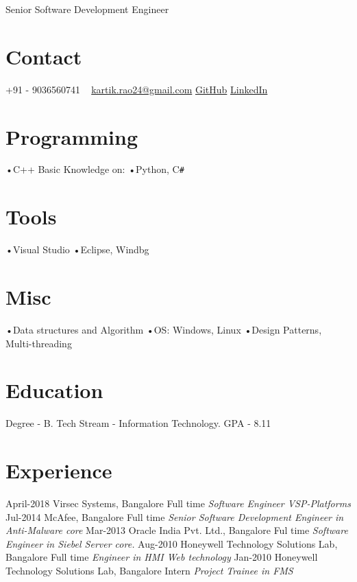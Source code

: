 \documentclass[]{kartikkumar-cv}
\begin{document}
       {Senior Software Development Engineer}
          
\begin{aside}
  \section{Contact}
    +91 - 9036560741
    ~
    \href{mailto:kartik.rao24@gmail.com}{kartik.rao24@gmail.com}
    \href{https://github.com/raokartikkumar24}{GitHub}
    \href{https://in.linkedin.com/in/raokartikkumar}{LinkedIn}
    ~
  \section{Programming}
   •C++ 
   Basic Knowledge on:
   •Python, C\texttt{\#}
    ~
    \section{Tools}
    •Visual Studio
    •Eclipse, Windbg
    \section{Misc}
   •Data structures and Algorithm
   •OS: Windows, Linux
   •Design Patterns, Multi-threading
~   
  \section{Education}
  	{Degree - B. Tech }
  	{Stream - Information Technology.}
  	{ GPA - 8.11}
~  	
\end{aside}

\section{Experience}

\begin{entrylist}
	\entry
	{April-2018}
	{Virsec Systems, Bangalore}
	{Full time}
	{\emph{Software Engineer VSP-Platforms}}
  \entry
    {Jul-2014}
    {McAfee, Bangalore}
    {Full time}
    {\emph{Senior Software Development Engineer in Anti-Malware core}}
  \entry
    {Mar-2013}
    {Oracle India Pvt. Ltd., Bangalore}
    {Ful time}
    {\emph{Software Engineer in Siebel Server core.}}
  \entry
    {Aug-2010}
    {Honeywell Technology Solutions Lab, Bangalore}
    {Full time}
    {\emph{Engineer in HMI Web technology}}
   \entry
   {Jan-2010}
   {Honeywell Technology Solutions Lab, Bangalore}
   {Intern}
   {\emph{Project Trainee in FMS} }
\end{entrylist}
\end{document}
